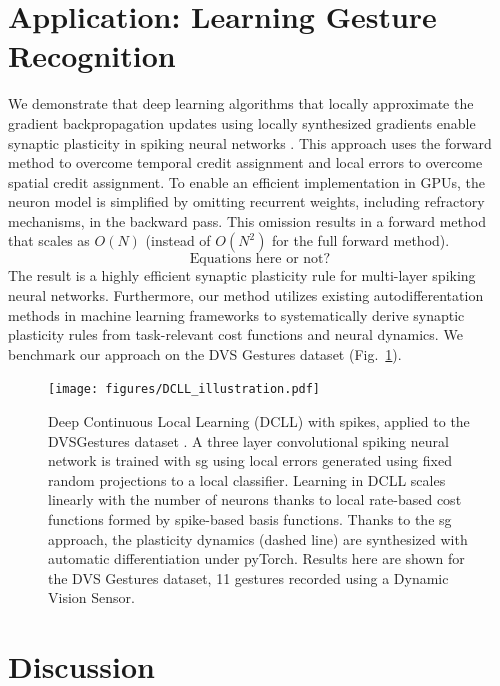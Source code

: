 \documentclass[journal,onecolumn,11pt]{IEEEtran}
\newcommand{\reffig}[1]{{\color{blue!70}(Fig.~\ref{#1})}}
\begin{document}
\section{Application: Learning Gesture Recognition}
We demonstrate that deep learning algorithms that locally approximate the gradient backpropagation updates using locally synthesized gradients enable synaptic plasticity in spiking neural networks \cite{Kaiser_etal18_synaplas}.
This approach uses the forward method to overcome temporal credit assignment and local errors to overcome spatial credit assignment. 
To enable an efficient implementation in GPUs, the neuron model is simplified by omitting recurrent weights, including refractory mechanisms, in the backward pass. This omission results in a forward method that scales as $O(N)$ (instead of $O(N^2)$ for the full forward method).
\begin{equation}
  \text{Equations here or not?}
\end{equation}
The result is a highly efficient synaptic plasticity rule for multi-layer spiking neural networks.
Furthermore, our method utilizes existing autodifferentation methods in machine learning frameworks to systematically derive synaptic plasticity rules from task-relevant cost functions and neural dynamics. 
We benchmark our approach on the DVS Gestures dataset \reffig{fig:dcll_gestures}. 
\begin{figure}
  \texttt{[image: figures/DCLL\_illustration.pdf]}
  \caption{\label{fig:dcll_gestures} Deep Continuous Local Learning (DCLL) with spikes, applied to the DVSGestures dataset \cite{Amir_etal17_lowpowe}. A three layer convolutional spiking neural network is trained with \gls{sg} using local errors generated using fixed random projections to a local classifier. Learning in DCLL scales linearly with the number of neurons thanks to local rate-based cost functions formed by spike-based basis functions. Thanks to the \gls{sg} approach, the plasticity dynamics (dashed line) are synthesized with automatic differentiation under pyTorch. Results here are shown for the DVS Gestures dataset, 11 gestures recorded using a Dynamic Vision Sensor.}
\end{figure}

\section{Discussion}
\end{document}
